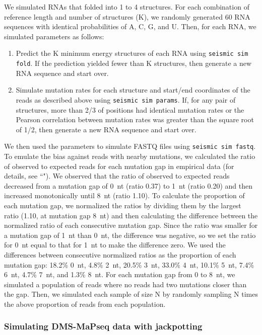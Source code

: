 \documentclass[11pt]{article}
\begin{document}
We simulated RNAs that folded into 1 to 4 structures.
For each combination of reference length and number of structures (K), we randomly generated 60 RNA sequences with identical probabilities of A, C, G, and U.
Then, for each RNA, we simulated parameters as follows:
\begin{enumerate}
    \item Predict the K minimum energy structures of each RNA using \verb|seismic sim fold|. If the prediction yielded fewer than K structures, then generate a new RNA sequence and start over.
    \item Simulate mutation rates for each structure and start/end coordinates of the reads as described above using \verb|seismic sim params|. If, for any pair of structures, more than 2/3 of positions had identical mutation rates or the Pearson correlation between mutation rates was greater than the square root of 1/2, then generate a new RNA sequence and start over.
\end{enumerate}
We then used the parameters to simulate FASTQ files using \verb|seismic sim fastq|.
To emulate the bias against reads with nearby mutations, we calculated the ratio of observed to expected reads for each mutation gap in empirical data (for details, see ``").
We observed that the ratio of observed to expected reads decreased from a mutation gap of 0~nt (ratio 0.37) to 1~nt (ratio 0.20) and then increased monotonically until 8~nt (ratio 1.10).
To calculate the proportion of each mutation gap, we normalized the ratios by dividing them by the largest ratio (1.10, at mutation gap 8~nt) and then calculating the difference between the normalized ratio of each consecutive mutation gap.
Since the ratio was smaller for a mutation gap of 1~nt than 0~nt, the difference was negative, so we set the ratio for 0~nt equal to that for 1~nt to make the difference zero.
We used the differences between consecutive normalized ratios as the proportion of each mutation gap: 18.2\% 0~nt, 4.8\% 2~nt, 20.5\% 3~nt, 33.0\% 4~nt, 10.1\% 5~nt, 7.4\% 6~nt, 4.7\% 7~nt, and 1.3\% 8~nt.
For each mutation gap from 0 to 8~nt, we simulated a population of reads where no reads had two mutations closer than the gap.
Then, we simulated each sample of size N by randomly sampling N times the above proportion of reads from each population.

\subsubsection{Simulating DMS-MaPseq data with jackpotting}
\label{sim-jackpotting}
\end{document}
